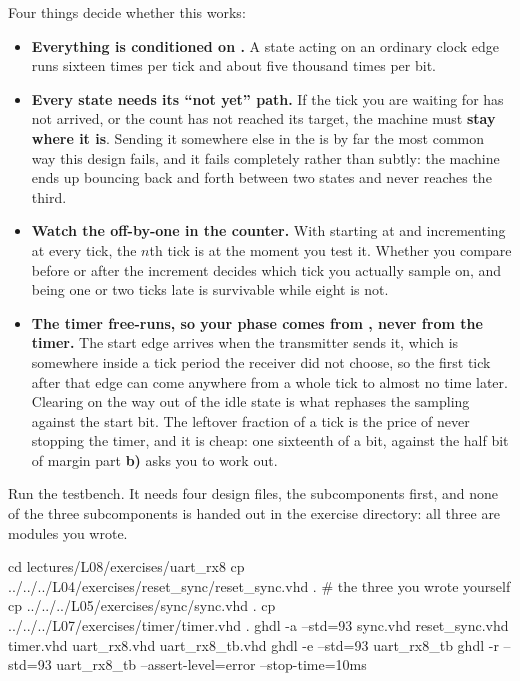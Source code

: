 Four things decide whether this works:
\begin{itemize}
  \item \textbf{Everything is conditioned on .} A state acting on an ordinary clock
    edge runs sixteen times per tick and about five thousand times per bit.
  \item \textbf{Every state needs its ``not yet'' path.} If the tick you are waiting for has not
    arrived, or the count has not reached its target, the machine must \textbf{stay where it is}.
    Sending it somewhere else in the  is by far the most common way this design fails, and
    it fails completely rather than subtly: the machine ends up bouncing back and forth between two
    states and never reaches the third.
  \item \textbf{Watch the off-by-one in the counter.} With  starting at  and
    incrementing at every tick, the $n$th tick is  at the moment you test it.
    Whether you compare before or after the increment decides which tick you actually sample on, and
    being one or two ticks late is survivable while eight is not.
  \item \textbf{The timer free-runs, so your phase comes from , never from the timer.}
    The start edge arrives when the transmitter sends it, which is somewhere inside a tick period the
    receiver did not choose, so the first tick after that edge can come anywhere from a whole tick to
    almost no time later. Clearing  on the way out of the idle state is what rephases the
    sampling against the start bit. The leftover fraction of a tick is the price of never stopping
    the timer, and it is cheap: one sixteenth of a bit, against the half bit of margin part
    \textbf{b)} asks you to work out.
\end{itemize}

 Run the testbench. It needs four design files, the subcomponents first, and none of the
three subcomponents is handed out in the exercise directory: all three are modules you wrote.

\begin{shell}
cd lectures/L08/exercises/uart_rx8
cp ../../../L04/exercises/reset_sync/reset_sync.vhd .     # the three you wrote yourself
cp ../../../L05/exercises/sync/sync.vhd .
cp ../../../L07/exercises/timer/timer.vhd .
ghdl -a --std=93 sync.vhd reset_sync.vhd timer.vhd uart_rx8.vhd uart_rx8_tb.vhd
ghdl -e --std=93 uart_rx8_tb
ghdl -r --std=93 uart_rx8_tb --assert-level=error --stop-time=10ms
\end{shell}

